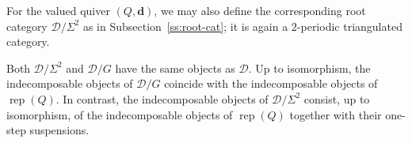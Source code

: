 \documentclass[12pt,reqno]{amsart}
\numberwithin{equation}{section}
\renewcommand{\mod}{\operatorname{mod}\nolimits}
\newcommand{\rep}{\operatorname{rep}\nolimits}
\begin{document}
	
	For the valued quiver $(Q,\mathbf d)$, we may also define the corresponding
	root category $\mathcal{D}/\Sigma^2$ as in Subsection~\ref{ss:root-cat}; it is
	again a $2$-periodic triangulated category.
	
	Both $\mathcal{D}/\Sigma^2$ and $\mathcal{D}/G$ have the same objects as $\mathcal{D}$. Up to isomorphism, the indecomposable objects of $\mathcal{D}/G$ coincide with the indecomposable objects of $\rep(Q)$. In contrast, the indecomposable objects of $\mathcal{D}/\Sigma^2$ consist, up to isomorphism, of the indecomposable objects of $\rep(Q)$ together with their one-step suspensions. 
	
\end{document}
